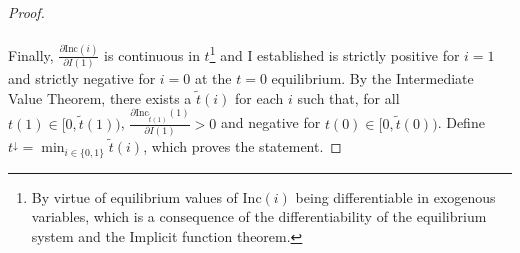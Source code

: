 \documentclass[12pt]{article}
\begin{document}
\begin{enumerate}
\begin{proof}
			\paragraph*{}
			Finally,  $\frac{\partial \text{Inc}(i)}{\partial I(1)}$ is continuous in $t$\footnote{By virtue of equilibrium values of $\text{Inc}(i)$ being differentiable in exogenous variables, which is a consequence of the differentiability of the equilibrium system and the Implicit function theorem.} and I established is strictly positive for $i = 1$ and strictly negative for $i = 0$ at the $t = 0$ equilibrium. By the Intermediate Value Theorem, there exists a $\tilde{t}(i)$ for each $i$ such that, for all $t(1) \in [0, \tilde{t}(1))$, $\frac{\partial \text{Inc}_{\tilde{t}(1)}(1)}{\partial I(1)} > 0$ and negative for $t(0) \in [0, \tilde{t}(0))$. Define $t^{\downarrow} = \min_{i \in \{0, 1\}}\tilde{t}(i)$, which proves the statement. 
		\end{proof}
		
	\end{enumerate}
	
	 
	
\end{document}
